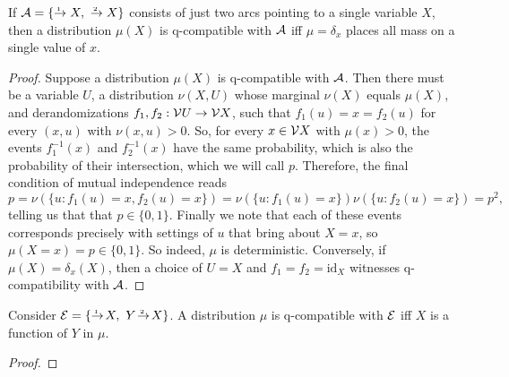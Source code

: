 \documentclass{article}
\newcommand{\CI}{\mathbin{\bot\!\!\!\bot}}
\begin{document}
\begin{prop} %
    If $\Ar = \{ \ed1{}X, ~ \ed2{}X \}$ consists of just two arcs pointing to a single variable $X$, 
    then a distribution $\mu(X)$ is q-compatible with $\mathcal A$ iff $\mu = \delta_x$ places all mass on a single value of $x$. 
\end{prop}
\begin{proof}
    Suppose a distribution $\mu(X)$ is q-compatible with $\mathcal A$. Then there must be a variable $U$, a distribution $\nu(X,U)$ whose marginal $\nu(X)$ equals $\mu(X)$, and derandomizations $f_1, f_2 : \mathcal V U \to \mathcal V X$, such that $f_1(u) = x = f_2(u)$ for every $(x,u)$ with $\nu(x,u) > 0$.
    So, for every $x \in \mathcal V X$ with $\mu(x) > 0$, the events $f^{-1}_1(x)$ and $f_2^{-1}(x)$ have the same probability, which is also the probability of their intersection, which we will call $p$.
    Therefore, the final condition of mutual independence reads
    \[
        p = \nu(\{ u : f_1(u) {=} x, f_2(u) {=} x\}) = \nu(\{u : f_1(u) {=} x\})\nu(\{u : f_2(u) {=} x\}) = p^2,
    \]
    telling us that that $p \in \{0,1\}$. Finally we note that each of these events corresponds precisely with settings of $u$ that bring about $X=x$, so $\mu(X{=}x) = p \in \{0,1\}$. So indeed, $\mu$ is deterministic. 
    Conversely, if $\mu(X) = \delta_x(X)$, then a choice of $U = X$ and $f_1 = f_2 = \mathrm{id}_X$ witnesses q-compatibility with $\mathcal A$. 
\end{proof}


\begin{prop}
    Consider $\Ed = \{ \ed 1{}{\!X},~ \ed2{Y\!}{\!X} \}$.
    A distribution $\mu$ is q-compatible with $\mathcal E$ iff
    $X$ is a function of $Y$ in $\mu$.
\end{prop}
\begin{proof}
    
\end{proof}
\end{document}
